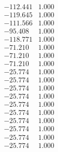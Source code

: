 \documentclass[conference]{IEEEtran}
\begin{document}
$$\begin{smallmatrix}
 &-112.441 &1.000\\
 &-119.645 &1.000\\
 &-111.566 &1.000\\
 &-95.408 &1.000\\
 &-118.771 &1.000\\
 &-71.210 &1.000\\
 &-71.210 &1.000\\
 &-71.210 &1.000\\
 &-25.774 &1.000\\
 &-25.774 &1.000\\
 &-25.774 &1.000\\
 &-25.774 &1.000\\
 &-25.774 &1.000\\
 &-25.774 &1.000\\
 &-25.774 &1.000\\
 &-25.774 &1.000\\
 &-25.774 &1.000\\
 &-25.774 &1.000
 \end{smallmatrix}
$$
\newpage
\end{document}
